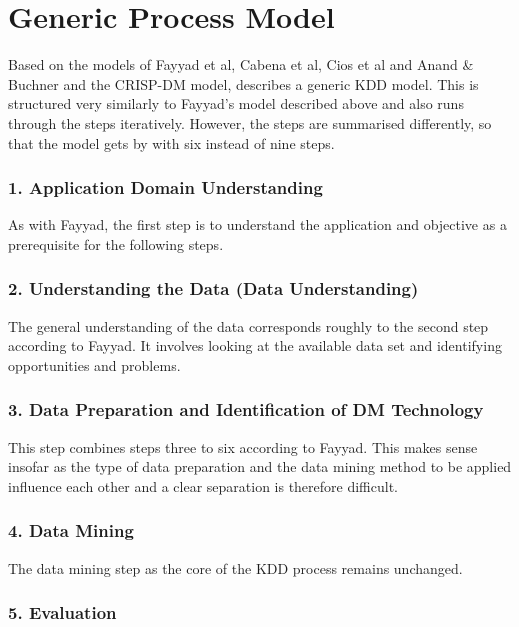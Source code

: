 \section{Generic Process Model}

Based on the models of Fayyad et al, Cabena et al, Cios et al and Anand \& Buchner and the CRISP-DM model, \cite{Kurgan:2006} describes a generic KDD model. This is structured very similarly to Fayyad's model described above and also runs through the steps iteratively. However, the steps are summarised differently, so that the model gets by with six instead of nine steps. 

\subsubsection{1. Application Domain Understanding}

As with Fayyad, the first step is to understand the application and objective as a prerequisite for the following steps.

\subsubsection{2. Understanding the Data (Data Understanding)}

The general understanding of the data corresponds roughly to the second step according to Fayyad. It involves looking at the available data set and identifying opportunities and problems.

\subsubsection{3. Data Preparation and Identification of DM Technology}

This step combines steps three to six according to Fayyad. This makes sense insofar as the type of data preparation and the data mining method to be applied influence each other and a clear separation is therefore difficult.


\subsubsection{4. Data Mining}

The data mining step as the core of the KDD process remains unchanged.

\subsubsection{5. Evaluation}

